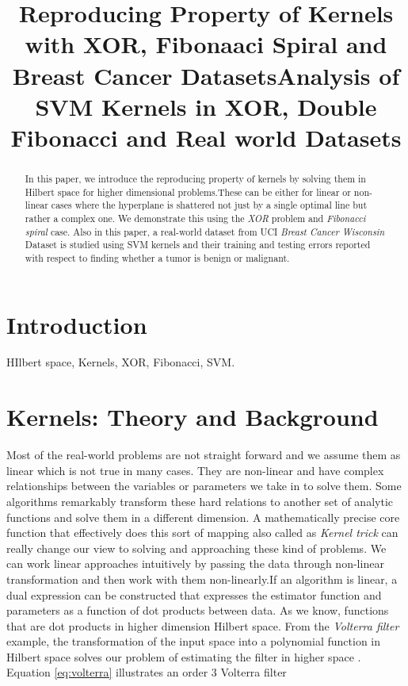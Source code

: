 \documentclass[conference]{IEEEtran}
\title{Reproducing Property of Kernels with XOR, Fibonaaci Spiral and Breast Cancer Datasets}
\title{Analysis of SVM Kernels in XOR, Double Fibonacci and Real world Datasets}
\author{\IEEEauthorblockN{Gangadharan Esakki}
\IEEEauthorblockA{\{gesakki\}{\tt @unm.edu}\\
               Department of Electrical and Computer Engineering \\
              The University of New Mexico, United States}}
\begin{document}
\maketitle

\section{Introduction} 
\begin{abstract}

In this paper, we introduce the reproducing property of kernels by solving them in Hilbert space for higher dimensional problems.These can be either for linear or non-linear cases where the hyperplane is shattered not just by a single optimal line but rather a complex one. We demonstrate this using the \textit {XOR} problem and \textit {Fibonacci spiral} case. Also in this paper, a real-world dataset from UCI \textit {Breast Cancer Wisconsin} Dataset is studied using SVM kernels and their training and testing errors reported with respect to finding whether a tumor is benign or malignant. 

\end{abstract}

\begin{IEEEkeywords}
HIlbert space, Kernels, XOR, Fibonacci, SVM.
\end{IEEEkeywords}


\section{Kernels: Theory and Background}
Most of the real-world problems are not straight forward and we assume them as linear which is not true in many cases. They are non-linear and have complex relationships between the variables or parameters we take in to solve them. Some algorithms remarkably transform these hard relations to another set of analytic functions and solve them in a different dimension. A mathematically precise core function that effectively does this sort of mapping also called as \textit{Kernel trick} can really change our view to solving and approaching these kind of problems. We can work linear approaches intuitively by passing the data  through non-linear transformation and then work with them non-linearly.If an algorithm is linear, a dual expression can be constructed that expresses the estimator function and parameters as a function of dot products between data. As we know, functions that are dot products in higher dimension Hilbert space. From the \textit{Volterra filter} example,
the transformation of the input space into a polynomial function in Hilbert space solves our problem of estimating the filter in higher space . Equation \ref{eq:volterra} illustrates an order 3 Volterra filter \cite{kernme}
\end{document}

